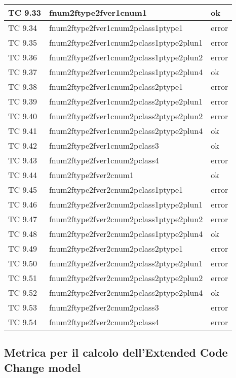 \begin{longtable}{|p{3cm}|p{7cm}|p{3cm}|}
	\hline
	TC 9.33			& fnum2ftype2fver1cnum1				& ok \tabularnewline
	\hline
	TC 9.34			& fnum2ftype2fver1cnum2pclass1ptype1		& error \tabularnewline
	\hline
	TC 9.35			& fnum2ftype2fver1cnum2pclass1ptype2plun1	& error \tabularnewline
	\hline
	TC 9.36			& fnum2ftype2fver1cnum2pclass1ptype2plun2	& error \tabularnewline
	\hline
	TC 9.37			& fnum2ftype2fver1cnum2pclass1ptype2plun4	& ok \tabularnewline
	\hline
	TC 9.38			& fnum2ftype2fver1cnum2pclass2ptype1		& error \tabularnewline
	\hline
	TC 9.39			& fnum2ftype2fver1cnum2pclass2ptype2plun1	& error \tabularnewline
	\hline
	TC 9.40			& fnum2ftype2fver1cnum2pclass2ptype2plun2	& error \tabularnewline
	\hline
	TC 9.41			& fnum2ftype2fver1cnum2pclass2ptype2plun4	& ok \tabularnewline
	\hline
	TC 9.42			& fnum2ftype2fver1cnum2pclass3			& ok \tabularnewline
	\hline
	TC 9.43			& fnum2ftype2fver1cnum2pclass4			& error \tabularnewline
	\hline
	TC 9.44			& fnum2ftype2fver2cnum1				& ok \tabularnewline
	\hline
	TC 9.45			& fnum2ftype2fver2cnum2pclass1ptype1		& error \tabularnewline
	\hline
	TC 9.46			& fnum2ftype2fver2cnum2pclass1ptype2plun1	& error \tabularnewline
	\hline
	TC 9.47			& fnum2ftype2fver2cnum2pclass1ptype2plun2	& error \tabularnewline
	\hline
	TC 9.48			& fnum2ftype2fver2cnum2pclass1ptype2plun4	& ok \tabularnewline
	\hline
	TC 9.49			& fnum2ftype2fver2cnum2pclass2ptype1		& error \tabularnewline
	\hline
	TC 9.50			& fnum2ftype2fver2cnum2pclass2ptype2plun1	& error \tabularnewline
	\hline
	TC 9.51			& fnum2ftype2fver2cnum2pclass2ptype2plun2	& error \tabularnewline
	\hline
	TC 9.52			& fnum2ftype2fver2cnum2pclass2ptype2plun4	& ok \tabularnewline
	\hline
	TC 9.53			& fnum2ftype2fver2cnum2pclass3			& error \tabularnewline
	\hline
	TC 9.54			& fnum2ftype2fver2cnum2pclass4			& error \tabularnewline
	\hline
\end{longtable}
\clearpage



\subsection{Metrica per il calcolo dell'Extended Code Change model}


